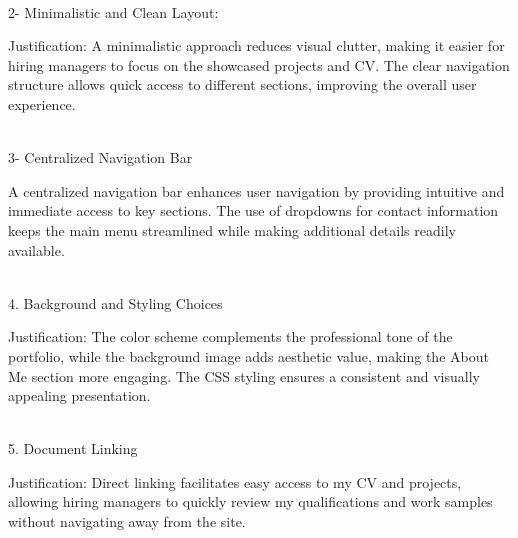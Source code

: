 \documentclass{article}
\begin{document}
\\

2- Minimalistic and Clean Layout:

Justification: A minimalistic approach reduces visual clutter, making it easier for hiring managers to focus on the showcased projects and CV. The clear navigation structure allows quick access to different sections, improving the overall user experience.

\\

3- Centralized Navigation Bar

A centralized navigation bar enhances user navigation by providing intuitive and immediate access to key sections. The use of dropdowns for contact information keeps the main menu streamlined while making additional details readily available.

\\

4. Background and Styling Choices

Justification: The color scheme complements the professional tone of the portfolio, while the background image adds aesthetic value, making the About Me section more engaging. The CSS styling ensures a consistent and visually appealing presentation.

\\

5. Document Linking

Justification: Direct linking facilitates easy access to my CV and projects, allowing hiring managers to quickly review my qualifications and work samples without navigating away from the site.
\end{document}
